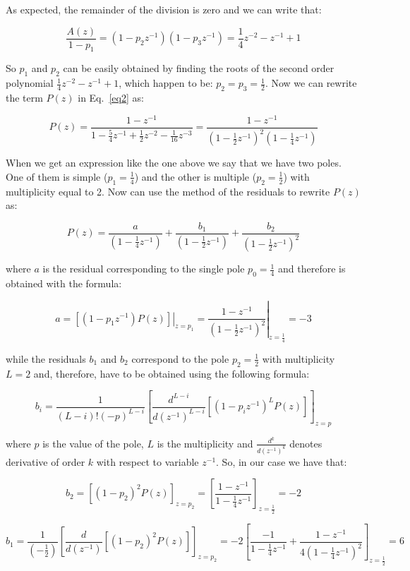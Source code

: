 \documentclass[a4paper,11pt,oneside]{article}
\begin{document}
As expected, the remainder of the division is zero and we can write that:

\[
\frac{A(z)}{1-p_1}=(1-p_{2}z^{-1})(1-p_{3}z^{-1})=\frac{1}{4}z^{-2}-z^{-1}+1
\]

So $p_1$ and $p_2$ can be easily obtained by finding the roots of the second order polynomial $\frac{1}{4}z^{-2}-z^{-1}+1$, which happen to be: $p_2=p_3=\frac{1}{2}$. Now we can rewrite the term $P(z)$ in Eq.~\ref{eq2} as:

\[
P(z)=\frac{1-z^{-1}}{1-\frac{5}{4}z^{-1}+\frac{1}{2}z^{-2}-\frac{1}{16}z^{-3}}=\frac{1-z^{-1}}{(1-\frac{1}{2}z^{-1})^2(1-\frac{1}{4}z^{-1})}
\]

When we get an expression like the one above we say that we have two poles. One of them is simple ($p_1=\frac{1}{4}$) and the other is multiple ($p_{2}=\frac{1}{2}$) with multiplicity equal to 2. Now can use the method of the residuals to rewrite $P(z)$ as:

\begin{equation}\label{fractionalexp}
P(z)=\frac{a}{(1-\frac{1}{4}z^{-1})}+\frac{b_1}{(1-\frac{1}{2}z^{-1})}+\frac{b_2}{(1-\frac{1}{2}z^{-1})^2}
\end{equation}

where $a$ is the residual corresponding to the single pole $p_0=\frac{1}{4}$ and therefore is obtained with the formula:

\[
a = \left.\left[(1-p_1z^{-1})P(z)\right]\right|_{z=p_1}=\left.\frac{1-z^{-1}}{(1-\frac{1}{2}z^{-1})^2}\right|_{z=\frac{1}{4}}=-3
\]

while the residuals $b_{1}$ and $b_{2}$ correspond to the pole $p_2=\frac{1}{2}$ with multiplicity $L=2$ and, therefore, have to be obtained using the following formula:

\[
b_{i} = \frac{1}{(L-i)!(-p)^{L-i}}\left[\frac{d^{L-i}}{d(z^{-1})^{L-i}}\left[(1-p_iz^{-1})^LP(z)\right]\right]_{z=p}
\]

where $p$ is the value of the pole, $L$ is the multiplicity and $\frac{d^k}{d(z^{-1})^k}$ denotes derivative of order $k$ with respect to variable $z^{-1}$. So, in our case we have that:

\[
b_2=\left[(1-p_2)^2P(z)\right]_{z=p_2}=\left[\frac{1-z^{-1}}{1-\frac{1}{4}z^{-1}}\right]_{z=\frac{1}{2}}=-2
\]

\[
b_1=\frac{1}{(-\frac{1}{2})}\left[\frac{d}{d(z^{-1})}\left[(1-p_2)^2P(z)\right]\right]_{z=p_2}=-2\left[\frac{-1}{1-\frac{1}{4}z^{-1}}+\frac{1-z^{-1}}{4(1-\frac{1}{4}z^{-1})^2}\right]_{z=\frac{1}{2}}=6
\]
\end{document}
